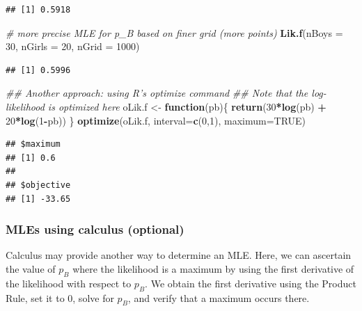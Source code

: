 \documentclass[
]{krantz}
\newenvironment{Shaded}{\begin{snugshade}}{\end{snugshade}}
\newcommand{\CommentTok}[1]{\textcolor[rgb]{0.37,0.37,0.37}{\textit{#1}}}
\newcommand{\ControlFlowTok}[1]{\textcolor[rgb]{0.27,0.27,0.27}{\textbf{#1}}}
\newcommand{\DataTypeTok}[1]{\textcolor[rgb]{0.27,0.27,0.27}{#1}}
\newcommand{\DecValTok}[1]{\textcolor[rgb]{0.06,0.06,0.06}{#1}}
\newcommand{\KeywordTok}[1]{\textcolor[rgb]{0.27,0.27,0.27}{\textbf{#1}}}
\newcommand{\NormalTok}[1]{#1}
\newcommand{\OperatorTok}[1]{\textcolor[rgb]{0.43,0.43,0.43}{\textbf{#1}}}
\newcommand{\OtherTok}[1]{\textcolor[rgb]{0.37,0.37,0.37}{#1}}
\newcommand{\StringTok}[1]{\textcolor[rgb]{0.5,0.5,0.5}{#1}}
\begin{document}
\begin{verbatim}
## [1] 0.5918
\end{verbatim}

\begin{Shaded}
\begin{Highlighting}[]
\CommentTok{# more precise MLE for p_B based on finer grid (more points)}
\KeywordTok{Lik.f}\NormalTok{(}\DataTypeTok{nBoys =} \DecValTok{30}\NormalTok{, }\DataTypeTok{nGirls =} \DecValTok{20}\NormalTok{, }\DataTypeTok{nGrid =} \DecValTok{1000}\NormalTok{)}
\end{Highlighting}
\end{Shaded}

\begin{verbatim}
## [1] 0.5996
\end{verbatim}

\begin{Shaded}
\begin{Highlighting}[]
\CommentTok{## Another approach: using R's optimize command}
\CommentTok{##   Note that the log-likelihood is optimized here}
\NormalTok{oLik.f <-}\StringTok{ }\ControlFlowTok{function}\NormalTok{(pb)\{}
    \KeywordTok{return}\NormalTok{(}\DecValTok{30}\OperatorTok{*}\KeywordTok{log}\NormalTok{(pb) }\OperatorTok{+}\StringTok{ }\DecValTok{20}\OperatorTok{*}\KeywordTok{log}\NormalTok{(}\DecValTok{1}\OperatorTok{-}\NormalTok{pb))}
\NormalTok{  \}}
\KeywordTok{optimize}\NormalTok{(oLik.f, }\DataTypeTok{interval=}\KeywordTok{c}\NormalTok{(}\DecValTok{0}\NormalTok{,}\DecValTok{1}\NormalTok{), }\DataTypeTok{maximum=}\OtherTok{TRUE}\NormalTok{)}
\end{Highlighting}
\end{Shaded}

\begin{verbatim}
## $maximum
## [1] 0.6
## 
## $objective
## [1] -33.65
\end{verbatim}

\hypertarget{calc-sec}{%
\subsubsection{MLEs using calculus (optional)}\label{calc-sec}}

Calculus may provide another way to determine an MLE. Here, we can ascertain the value of \(p_B\) where the likelihood is a maximum by using the first derivative of the likelihood with respect to \(p_B\). We obtain the first derivative using the Product Rule, set it to 0, solve for \(p_B\), and verify that a maximum occurs there.
\end{document}
